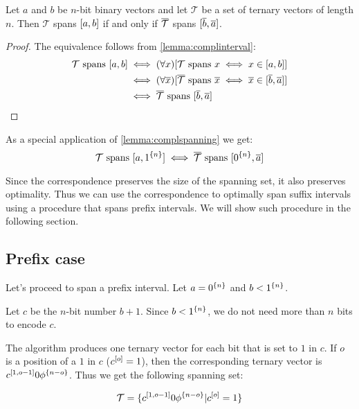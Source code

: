 \begin{lemma}
\label{lemma:complspanning}
Let $a$ and $b$ be $n$-bit binary vectors
and let $\mathcal{T}$ be a set of ternary vectors of length $n$.
Then
$\mathcal{T}$ spans $[a, b]$
if and only if
$\overline{\mathcal{T}}$ spans $[\overline{b}, \overline{a}]$.
\end{lemma}

\begin{proof}
The equivalence follows from \cref{lemma:complinterval}:
\begin{align*}
\mathcal{T} \text{ spans } [a, b]
&\iff (\forall x) [\mathcal{T} \text{ spans } x \iff x \in [a, b]] \\
&\iff (\forall \overline{x}) [\overline{\mathcal{T}} \text{ spans } \overline{x} \iff \overline{x} \in [\overline{b}, \overline{a}]] \\
&\iff \overline{\mathcal{T}} \text{ spans } [\overline{b}, \overline{a}]
\end{align*}
\end{proof}

As a special application of \cref{lemma:complspanning}
we get:
$$
\mathcal{T} \text{ spans } [a, 1^{\{n\}}]
\iff
\overline{\mathcal{T}}
\text{ spans } [0^{\{n\}}, \overline{a}]
$$

Since the correspondence preserves
the size of the spanning set,
it also preserves optimality.
Thus we can use the correspondence to optimally span
suffix intervals
using a procedure that spans prefix intervals.
We will show such procedure in the following section.

\subsection{Prefix case}
\label{sec:prefix}

Let's proceed to span a prefix interval.
Let $a = 0^{\{n\}}$ and $b < 1^{\{n\}}$.

Let $c$ be the $n$-bit number $b + 1$.
Since $b < 1^{\{n\}}$,
we do not need more than $n$ bits to encode $c$.

The algorithm produces one ternary vector
for each bit that is set to $1$ in $c$.
If $o$ is a position of a $1$ in $c$
($c^{[o]} = 1$),
then the corresponding ternary vector
is $c^{[1, o - 1]} 0 \phi^{\{n - o\}}$.
Thus we get the following spanning set:

\begin{equation*}
\mathcal{T} =
\{c^{[1, o - 1]} 0 \phi^{\{n - o\}} | c^{[o]} = 1\}
\end{equation*}

